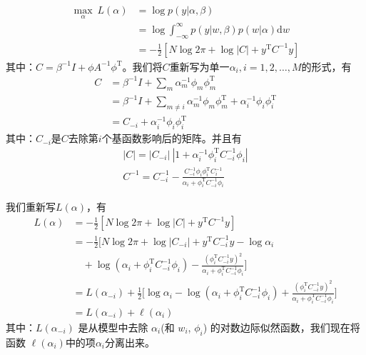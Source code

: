         \begin{align*}
        \max _\alpha \ L(\alpha) &= \log p(y|\alpha,\beta) \\
        &= \log \int_{-\infty}^\infty p(y|w,\beta) p(w|\alpha)\mathrm{d}w\\
        &= -\frac{1}{2} [N\log 2\pi + \log |C| + y^\mathrm{T}C^{-1}y]
        \end{align*}
        其中：$C = \beta^{-1}I+\phi A^{-1}\phi^\mathrm{T}$。我们将$C$重新写为单一$\alpha_i,i = 1,2,\dots,M$的形式，有
        \begin{align*}
        C &= \beta^{-1}I + \sum_m \alpha_m^{-1}\phi_m\phi_m^\mathrm{T} \\
        &= \beta^{-1}I+ \sum_{m\neq i}\alpha_m^{-1}\phi_m\phi_m^\mathrm{T} + \alpha_i^{-1}\phi_i\phi_i^\mathrm{T} \\
        &= C_{-i}+\alpha_i^{-1}\phi_i\phi_i^\mathrm{T}
        \end{align*}
        其中：$C_{-i}$是$C$去除第$i$个基函数影响后的矩阵。并且有
        \begin{align*}
        |C| = |C_{-i}|\ |1+\alpha_i^{-1}\phi_i^\mathrm{T}C_{-i}^{-1}\phi_i| \\
        C^{-1} = C_{-i}^{-1} - \frac{C_{-i}^{-1}\phi_i\phi_i^\mathrm{T}C_{i}^{-1 }}{\alpha_i + \phi_i^\mathrm{T}C_{-i}^{-1}\phi_i}
        \end{align*}
        \par
        我们重新写$L(\alpha)$，有
        \begin{align*}
        L(\alpha) &= -\frac{1}{2}[N\log 2\pi +\log |C| + y^\mathrm{T}C^{-1}y] \\
        &= -\frac{1}{2} \biggl[N\log 2\pi + \log |C_{-i}| + y^\mathrm{T}C_{-i}^{-1}y - \log \alpha_i \\
        &\quad + \log (\alpha_i + \phi_i^\mathrm{T} C_{-i}^{-1} \phi_i) - \frac{(\phi_i^\mathrm{T}C_{-i}^{-1}y)^2 }{\alpha_i+ \phi_i^\mathrm{T} C_{-i}^{-1}\phi_i}  \biggr] \\
        &=L(\alpha_{-i})+ \frac{1}{2} \biggl[ \log \alpha_i - \log(\alpha_i + \phi_i^\mathrm{T}C_{-i}^{-1}\phi_i) +\frac{(\phi_i^\mathrm{T} C_{-i}^{-1}y)^2}{\alpha_i +\phi_i^\mathrm{T} C_{-i}^{-1}\phi_i}  \biggr] \\
        &=L(\alpha_{-i})+ \ell(\alpha_i)
        \end{align*}
        其中：$L(\alpha_{-i})$ 是从模型中去除 $\alpha_i$(和 $w_i$, $\phi_i$) 的对数边际似然函数，我们现在将函数 $\ell(\alpha_i)$中的项$\alpha_i$分离出来。
        \par
